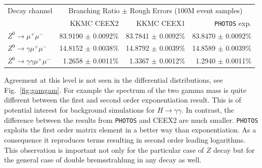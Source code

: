 \documentclass[]{Photos_interface_design}
\begin{document}
\begin{table}
\centering 
\begin{tabular}{lrrr} 
\toprule 
Decay channel &\multicolumn{3}{c}{ Branching Ratio $\pm$ Rough Errors   (100M event samples)} \\ 
      & {KKMC CEEX2} & {KKMC CEEX1} & {\tt PHOTOS} exp.\\ 
\midrule
 {$Z^{0} \rightarrow \mu^{+} \mu^{-} $} & {83.9190 $\pm$  0.0092\%} &{  83.7841 $\pm$  0.0092\%} & 83.8470 $\pm$ 0.0092\%\\ 
 {$Z^{0} \rightarrow \gamma \mu^{+} \mu^{-} $} & {14.8152 $\pm$  0.0038\%} &{  14.8792 $\pm$  0.0039\%} & 14.8589 $\pm$ 0.0039\% \\ 
{$Z^{0} \rightarrow \gamma \gamma \mu^{+} \mu^{-} $} & { 1.2658 $\pm$  0.0011\%} &{   1.3367 $\pm$  0.0012\%} & 1.2940 $\pm$ 0.0011\%\\ 
\bottomrule
\end{tabular}
\end{table}

Agreement at this level is not seen in the differential distributions, see Fig.~\ref{fig:gamgam}. For example the spectrum of 
the two gamma mass is quite different between the first and second order 
exponentiation result. This is of potential interest for background simulations 
for $H \to \gamma \gamma$. In contrast, the difference between the results from {\tt PHOTOS} and CEEX2 are much smaller. {\tt PHOTOS} exploits the first order matrix element 
in a better way than exponentiation. As a consequence it reproduces terms resulting in second order leading logarithms. This observation is important not only for 
the particular case of $Z$ decay but for the general case of double bremsstrahlung in any decay as well.
\end{document}
